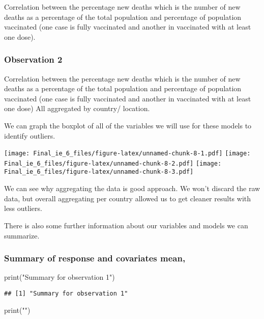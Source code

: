 \documentclass[
  12pt,
]{article}
\newenvironment{Shaded}{\begin{snugshade}}{\end{snugshade}}
\newcommand{\FunctionTok}[1]{\textcolor[rgb]{0.00,0.00,0.00}{#1}}
\newcommand{\NormalTok}[1]{#1}
\newcommand{\StringTok}[1]{\textcolor[rgb]{0.31,0.60,0.02}{#1}}
\begin{document}
Correlation between the percentage new deaths which is the number of new
deaths as a percentage of the total population and percentage of
population vaccinated (one case is fully vaccinated and another in
vaccinated with at least one dose).

\hypertarget{observation-2}{%
\subsubsection{Observation 2}\label{observation-2}}

Correlation between the percentage new deaths which is the number of new
deaths as a percentage of the total population and percentage of
population vaccinated (one case is fully vaccinated and another in
vaccinated with at least one dose) All aggregated by country/ location.

We can graph the boxplot of all of the variables we will use for these
models to identify outliers.

\texttt{[image: Final\_ie\_6\_files/figure-latex/unnamed-chunk-8-1.pdf]}
\texttt{[image: Final\_ie\_6\_files/figure-latex/unnamed-chunk-8-2.pdf]}
\texttt{[image: Final\_ie\_6\_files/figure-latex/unnamed-chunk-8-3.pdf]}

We can see why aggregating the data is good approach. We won't discard
the raw data, but overall aggregating per country allowed us to get
cleaner results with less outliers.

There is also some further information about our variables and models we
can summarize.

\hypertarget{summary-of-response-and-covariates-mean}{%
\subsubsection{Summary of response and covariates
mean,}\label{summary-of-response-and-covariates-mean}}

\begin{Shaded}
\begin{Highlighting}[]
\FunctionTok{print}\NormalTok{(}\StringTok{"Summary for observation 1"}\NormalTok{)}
\end{Highlighting}
\end{Shaded}

\begin{verbatim}
## [1] "Summary for observation 1"
\end{verbatim}

\begin{Shaded}
\begin{Highlighting}[]
\FunctionTok{print}\NormalTok{(}\StringTok{""}\NormalTok{)}
\end{Highlighting}
\end{Shaded}
\end{document}

